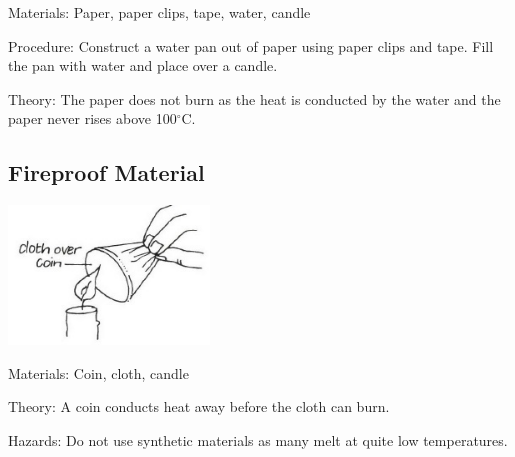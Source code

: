 \begin{multicols}{2}
\begin{description*}
\item[Materials:]{Paper, paper clips, tape, water, candle}
\item[Procedure:]{Construct a water pan out of paper using paper clips and tape. Fill the pan with water and place over a candle.}
\item[Theory:]{The paper does not burn as the heat is conducted by the water and the paper never rises above 100$^\circ$C.}
\end{description*}

\subsection{Fireproof Material}

\begin{center}
\includegraphics[width=0.4\textwidth]{./img/vso/fireproof.jpg}
\end{center}

\begin{description*}
\item[Materials:]{Coin, cloth, candle}
\item[Theory:]{A coin conducts heat away before the cloth can burn.}
\item[Hazards:]{Do not use synthetic materials as many melt at quite low temperatures.}
\end{description*}


\end{multicols}
